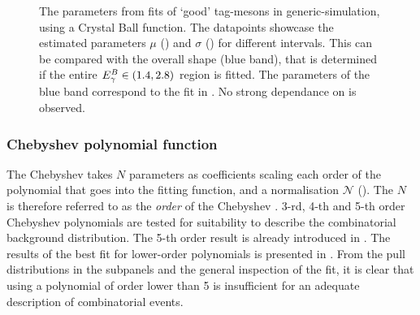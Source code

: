 \begin{figure}[htbp!]
    \caption{\label{fig:crystal_ball_par_test}The parameters from \Mbc fits of `good' tag-\B mesons in generic-\BB simulation, using a Crystal Ball function.
    The datapoints showcase the estimated parameters $\mu$ () and $\sigma$ () for different
    \EB intervals.
    This can be compared with the overall shape (blue band), that is determined if the entire ${E^B_{\gamma}}\in(1.4,2.8)$ region is fitted.
    The parameters of the blue band correspond to the fit in .
    No strong dependance on \EB is observed.
    }
\end{figure}

\subsubsection{Chebyshev polynomial function}\label{sec:chebyshev_prefit}

The Chebyshev \PDF takes $N$ parameters as coefficients scaling each order of the polynomial that goes into the fitting function, and a normalisation $\mathcal{N}$ ().
The $N$ is therefore referred to as the \textit{order} of the Chebyshev \PDF.
3-rd, 4-th and 5-th order Chebyshev polynomials are tested for suitability to describe the combinatorial \BB background distribution.
The 5-th order result is already introduced in .
The results of the best fit for lower-order polynomials is presented in .
From the pull distributions in the subpanels and the general inspection of the fit, it is clear that using a polynomial of order lower than 5 is insufficient for an adequate description of combinatorial \BB events.

